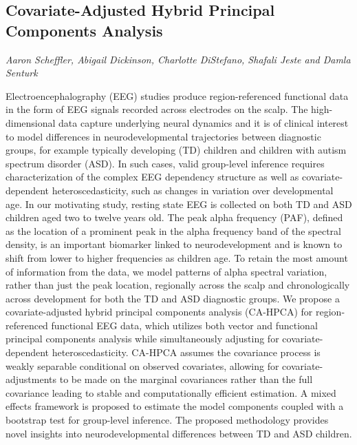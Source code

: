 \documentclass[../booklet.tex]{subfiles}
\begin{document}
\subsection[Covariate-Adjusted Hybrid Principal Components Analysis. {\it Aaron Scheffler, Abigail Dickinson, Charlotte DiStefano, Shafali Jeste and Damla Senturk}]{Covariate-Adjusted Hybrid Principal Components Analysis}
    

\begin{center}
  {\it Aaron Scheffler, Abigail Dickinson, Charlotte DiStefano, Shafali Jeste and Damla Senturk}
\end{center}

\vskip 0.8cm


Electroencephalography (EEG) studies produce region-referenced functional data in the form of EEG signals recorded across electrodes on the scalp. The high-dimensional data capture underlying neural dynamics and it is of clinical interest to model differences in neurodevelopmental trajectories between diagnostic groups, for example typically developing (TD) children and children with autism spectrum disorder (ASD). In such cases, valid group-level inference requires characterization of the complex EEG dependency structure as well as covariate-dependent heteroscedasticity, such as changes in variation over developmental age. In our motivating study, resting state EEG is collected on both TD and ASD children aged two to twelve years old. The peak alpha frequency (PAF), defined as the location of a prominent peak in the alpha frequency band of the spectral density, is an important biomarker linked to neurodevelopment and is known to shift from lower to higher frequencies as children age. To retain the most amount of information from the data, we model patterns of alpha spectral variation, rather than just the peak location, regionally across the scalp and chronologically across development for both the TD and ASD diagnostic groups. We propose a covariate-adjusted hybrid principal components analysis (CA-HPCA) for region-referenced functional EEG data, which utilizes both vector and functional principal components analysis while simultaneously adjusting for covariate-dependent heteroscedasticity. CA-HPCA assumes the covariance process is weakly separable conditional on observed covariates, allowing for covariate-adjustments to be made on the marginal covariances rather than the full covariance leading to stable and computationally efficient estimation. A mixed effects framework is proposed to estimate the model components coupled with a bootstrap test for group-level inference. The proposed methodology provides novel insights into neurodevelopmental differences between TD and ASD children. 

\end{document}
